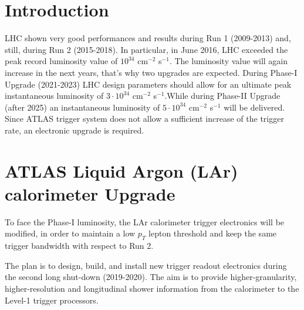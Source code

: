 \documentclass{llncs}
\begin{document}
\section{Introduction}
LHC shown very good performances and results during Run 1 (2009-2013) and, still, during Run 2 (2015-2018). In particular, in June 2016, LHC exceeded the peak record luminosity value of $10^{34}$ cm$^{-2}$ s$^{-1}$. The luminosity value will again increase in the next years, that's why two upgrades are expected. During Phase-I Upgrade (2021-2023) LHC design parameters should allow for an ultimate peak instantaneous luminosity of $3 \cdot 10^{34}$ cm$^{-2}$ s$^{-1}$.While during Phase-II Upgrade (after 2025) an instantaneous luminosity of $5 \cdot 10^{34}$ cm$^{-2}$ s$^{-1}$ will be delivered. Since ATLAS trigger system does not allow a sufficient increase of the trigger rate, an electronic upgrade is required.

\section{ATLAS Liquid Argon (LAr) calorimeter Upgrade}


To face the Phase-I luminosity, the LAr calorimeter trigger electronics will be modified, in order to maintain a low $p_{T}$ lepton threshold and keep the same trigger bandwidth with respect to Run 2.

The plan is to design, build, and install new trigger readout electronics during the second long shut-down (2019-2020). The aim is to   provide higher-granularity, higher-resolution and longitudinal shower information from the calorimeter to the Level-1 trigger processors.
\end{document}
